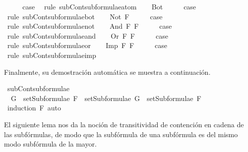 \begin{isabellebody}
\ \ \isamarkupfalse%
\ \isamarkupfalse%
\ {\isacharquery}case\ \isamarkupfalse%
\ {\isacharparenleft}rule\ subContsubformulae{\isacharunderscore}atom{\isacharparenright}\isanewline
{}\isamarkupfalse%
\isanewline
\ \ \isamarkupfalse%
\ Bot\isanewline
\ \ \isamarkupfalse%
\ \isamarkupfalse%
\ {\isacharquery}case\ \isamarkupfalse%
\ {\isacharparenleft}rule\ subContsubformulae{\isacharunderscore}bot{\isacharparenright}\isanewline
{}\isamarkupfalse%
\isanewline
\ \ \isamarkupfalse%
\ {\isacharparenleft}Not\ F{\isacharparenright}\isanewline
\ \ \isamarkupfalse%
\ \isamarkupfalse%
\ {\isacharquery}case\ \isamarkupfalse%
\ {\isacharparenleft}rule\ subContsubformulae{\isacharunderscore}not{\isacharparenright}\isanewline
{}\isamarkupfalse%
\isanewline
\ \ \isamarkupfalse%
\ {\isacharparenleft}And\ F{}\ F{}{\isacharparenright}\isanewline
\ \ \isamarkupfalse%
\ \isamarkupfalse%
\ {\isacharquery}case\ \isamarkupfalse%
\ {\isacharparenleft}rule\ subContsubformulae{\isacharunderscore}and{\isacharparenright}\isanewline
{}\isamarkupfalse%
\isanewline
\ \ \isamarkupfalse%
\ {\isacharparenleft}Or\ F{}\ F{}{\isacharparenright}\isanewline
\ \ \isamarkupfalse%
\ \isamarkupfalse%
\ {\isacharquery}case\ \isamarkupfalse%
\ {\isacharparenleft}rule\ subContsubformulae{\isacharunderscore}or{\isacharparenright}\isanewline
{}\isamarkupfalse%
\isanewline
\ \ \isamarkupfalse%
\ {\isacharparenleft}Imp\ F{}\ F{}{\isacharparenright}\isanewline
\ \ \isamarkupfalse%
\ \isamarkupfalse%
\ {\isacharquery}case\ \isamarkupfalse%
\ {\isacharparenleft}rule\ subContsubformulae{\isacharunderscore}imp{\isacharparenright}\isanewline
{}\isamarkupfalse%
%
\endisatagproof
{\isafoldproof}%
%
\isadelimproof
%
\endisadelimproof
%
\begin{isamarkuptext}%
Finalmente, su demostración automática se muestra a continuación.%
\end{isamarkuptext}\isamarkuptrue%
\isamarkupfalse%
\ subContsubformulae{\isacharcolon}\isanewline
\ \ {\isachardoublequoteopen}G\ {\isasymin}\ setSubformulae\ F\ {\isasymLongrightarrow}\ setSubformulae\ G\ {\isasymsubseteq}\ setSubformulae\ F{\isachardoublequoteclose}\isanewline
%
\isadelimproof
\ \ %
\endisadelimproof
%
\isatagproof
{}\isamarkupfalse%
\ {\isacharparenleft}induction\ F{\isacharparenright}\ auto%
\endisatagproof
{\isafoldproof}%
%
\isadelimproof
%
\endisadelimproof
%
\begin{isamarkuptext}%
El siguiente lema nos da la noción de transitividad de contención 
  en cadena de las subfórmulas, de modo que la subfórmula de una 
  subfórmula es del mismo modo subfórmula de la mayor.


\end{isamarkuptext}
\end{isabellebody}
